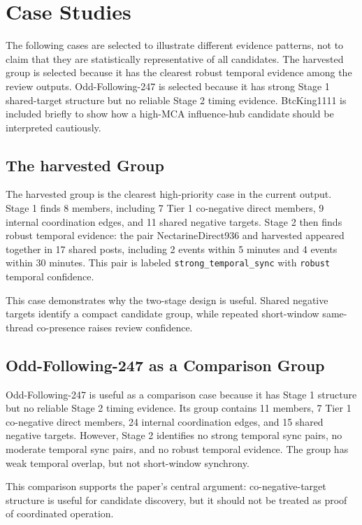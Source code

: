 \documentclass[conference]{IEEEtran}
\begin{document}
\section{Case Studies}

The following cases are selected to illustrate different evidence patterns,
not to claim that they are statistically representative of all candidates.
The harvested group is selected because it has the clearest robust temporal
evidence among the review outputs. Odd-Following-247 is selected because it has
strong Stage 1 shared-target structure but no reliable Stage 2 timing evidence.
BtcKing1111 is included briefly to show how a high-MCA influence-hub candidate
should be interpreted cautiously.

\subsection{The harvested Group}

The harvested group is the clearest high-priority case in the current output.
Stage 1 finds 8 members, including 7 Tier 1 co-negative direct members, 9
internal coordination edges, and 11 shared negative targets. Stage 2 then
finds robust temporal evidence: the pair NectarineDirect936 and harvested
appeared together in 17 shared posts, including 2 events within 5 minutes and
4 events within 30 minutes. This pair is labeled
\texttt{strong\_temporal\_sync} with \texttt{robust} temporal confidence.

This case demonstrates why the two-stage design is useful. Shared negative
targets identify a compact candidate group, while repeated short-window
same-thread co-presence raises review confidence.

\subsection{Odd-Following-247 as a Comparison Group}

Odd-Following-247 is useful as a comparison case because it has Stage 1
structure but no reliable Stage 2 timing evidence. Its group contains 11
members, 7 Tier 1 co-negative direct members, 24 internal coordination edges,
and 15 shared negative targets. However, Stage 2 identifies no strong temporal
sync pairs, no moderate temporal sync pairs, and no robust temporal evidence.
The group has weak temporal overlap, but not short-window synchrony.

This comparison supports the paper's central argument: co-negative-target
structure is useful for candidate discovery, but it should not be treated as
proof of coordinated operation.
\end{document}
